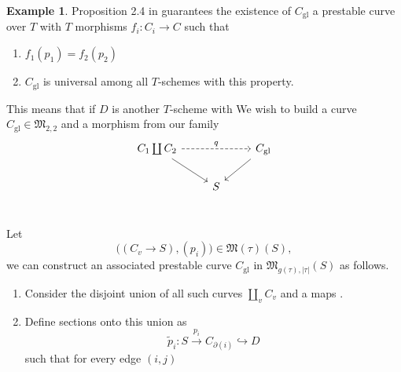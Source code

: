 \documentclass[11pt]{article}
\newcommand{\MM}{\mathfrak{M}}
\newcommand{\del}{\partial}
\renewcommand{\tilde}{\widetilde}
\theoremstyle{plain}
\theoremstyle{remark}
\newcommand{\hookto}{\hookrightarrow}
\newcommand{\gl}{\mathrm{gl}}
\theoremstyle{plain}
\theoremstyle{definition}
\newtheorem{Ex}[Th]{Example}
\theoremstyle{remark}
\begin{document}
\begin{ptcb}
\begin{Ex}
  Proposition 2.4 in \cite{BM} guarantees the existence of \(C_{\gl}\) a prestable curve over \(T\) with \(T\) morphisms \(f_i:C_i\to C\) such that 
  \begin{enumerate}
    \item \(f_1(p_1)=f_2(p_2)\)
    \item \(C_{\gl}\) is universal among all \(T\)-schemes with this property. 
  \end{enumerate}
  This means that if \(D\) is another \(T\)-scheme with 
  We wish to build a curve \(C_{\gl}\in\MM_{2,2}\) and a morphism from our family
  \[
  \begin{tikzcd}
    C_1\coprod C_2\arrow[dr] \arrow[rr,"q",dashed] && C_{\gl}\arrow[dl] \\
    & S  \\
  \end{tikzcd}
  \]
\end{Ex}
Let 
\[
\bigl((C_v\to S),(p_i)\bigr)\in\MM(\tau)(S),
\]
we can construct an associated prestable curve \(C_{\gl}\) in \(\MM_{g(\tau),|\tau|}(S)\) as follows.
\begin{enumerate}
  \item Consider the disjoint union of all such curves \(\coprod_vC_v\) and a maps .
  \item Define sections onto this union as 
  \[
    \tilde{p}_i:S\xrightarrow{p_i}C_{\del(i)}\hookto D
  \]
  such that for every edge \((i,j)\) 
\end{enumerate}
\end{ptcb}
\end{document}
